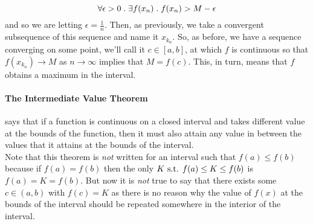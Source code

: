 \documentclass[../MathsNotesBase.tex]{subfiles}
\begin{document}
{		\[ \forall \epsilon > 0 \;.\; \exists f(x_n) \;.\; f(x_n) > M - \epsilon \]
		and so we are letting ${ \epsilon = \frac{1}{n} }$. Then, as previously, we take a convergent subsequence of this sequence and name it $x_{k_n}$. So, as before, we have a sequence converging on some point, we'll call it ${ c \in [a,b] }$, at which $f$ is continuous so that ${ f(x_{k_n}) \to M }$ as ${ n \to \infty }$ implies that ${ M = f(c) }$. This, in turn, means that $f$ obtains a maximum in the interval.
	}
	


	\bigskip
	\paragraph{The Intermediate Value Theorem} says that if a function is continuous on a closed interval and takes different value at the bounds of the function, then it must also attain any value in between the values that it attains at the bounds of the interval.\\
	Note that this theorem is \textit{not} written for an interval such that ${ f(a) \leq f(b) }$ because if ${ f(a) = f(b) }$ then the only ${ K \text{ s.t. } f(a) \leq K \leq f(b) }$ is ${ f(a) = K = f(b) }$. But now it is \textit{not} true to say that there exists some ${ c \in (a,b) }$ with ${ f(c) = K }$ as there is no reason why the value of $f(x)$ at the bounds of the interval should be repeated somewhere in the interior of the interval.
	
\end{document}
